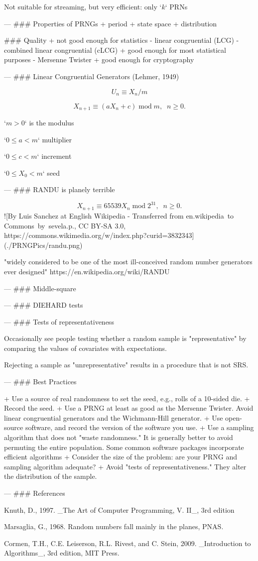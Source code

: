Not suitable for streaming, but very efficient: only `\(k\)` PRNs

---
### Properties of PRNGs
+ period
+ state space
+ distribution

### Quality
+ not good enough for statistics
    - linear congruential (LCG)
    - combined linear congruential (cLCG)
+ good enough for most statistical purposes
    - Mersenne Twister
+ good enough for cryptography

---
### Linear Congruential Generators (Lehmer, 1949)

$$U_n \equiv X_n/m$$

$$ X_{n+1} \equiv (a X_n + c)\; \mathrm{mod} \; m, \;\; n \ge 0.$$

`\( m > 0\)` is the modulus

`\( 0 \le a < m\)` multiplier

`\(0 \le c < m\)` increment

`\(0 \le X_0 < m\)` seed

---
### RANDU is planely terrible

$$ X_{n+1} \equiv 65539 X_n\; \mathrm{mod} \; 2^{31}, \;\; n \ge 0.$$
![By Luis Sanchez at English Wikipedia - Transferred from en.wikipedia to Commons by sevela.p., CC BY-SA 3.0, https://commons.wikimedia.org/w/index.php?curid=3832343](./PRNGPics/randu.png)

"widely considered to be one of the most ill-conceived random number generators ever designed" https://en.wikipedia.org/wiki/RANDU

---
### Middle-square

---
### DIEHARD tests

---
### Tests of representativeness

Occasionally see people testing whether a random sample is "representative" by
comparing the values of covariates with expectations.

Rejecting a sample as "unrepresentative" results in a procedure that is not SRS.

---
### Best Practices

+ Use a source of real randomness to set the seed, e.g., rolls of a 10-sided die.
+ Record the seed.
+ Use a PRNG at least as good as the Mersenne Twister. 
Avoid linear congruential generators and the Wichmann-Hill generator.
+ Use open-source software, and record the version of the software you use.
+ Use a sampling algorithm that does not "waste randomness." 
It is generally better to avoid permuting the entire population.
Some common software packages incorporate efficient algorithms
+ Consider the size of the problem: are your PRNG and sampling algorithm adequate?
+ Avoid "tests of representativeness." They alter the distribution of the sample.

---
### References

Knuth, D., 1997. _The Art of Computer Programming, V. II_, 3rd edition

Marsaglia, G., 1968. Random numbers fall mainly in the planes, PNAS.

Cormen, T.H., C.E. Leiserson, R.L. Rivest, and C. Stein, 2009. 
_Introduction to Algorithms_, 3rd edition, MIT Press.

